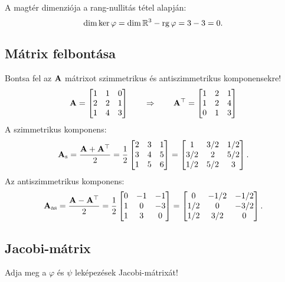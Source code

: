 \documentclass{szb-solution}
\begin{document}
A magtér dimenziója a rang-nullitás tétel alapján:
$$
  \dim \ker \varphi = \dim \mathbb{R}^3 - \operatorname{rg} \varphi = 3 - 3 = 0
  \text.
$$

\subsection{Mátrix felbontása}

Bontsa fel az $\mathbf{A}$ mátrixot szimmetrikus és antiszimmetrikus komponensekre!
$$
  \mathbf{A} = \begin{bmatrix}
    1 & 1 & 0 \\
    2 & 2 & 1 \\
    1 & 4 & 3
  \end{bmatrix}
  \qquad\Rightarrow\qquad
  \mathbf{A}^\top = \begin{bmatrix}
    1 & 2 & 1 \\
    1 & 2 & 4 \\
    0 & 1 & 3
  \end{bmatrix}
$$
A szimmetrikus komponens:
$$
  \mathbf{A}_\text{s} = \frac{\mathbf{A} + \mathbf{A}^\top}{2} = \frac{1}{2} \begin{bmatrix}
    2 & 3 & 1 \\
    3 & 4 & 5 \\
    1 & 5 & 6
  \end{bmatrix} = \begin{bmatrix}
    1   & 3/2 & 1/2 \\
    3/2 & 2   & 5/2 \\
    1/2 & 5/2 & 3
  \end{bmatrix}
  \text.
$$
Az antiszimmetrikus komponens:
$$
  \mathbf{A}_\text{as} = \frac{\mathbf{A} - \mathbf{A}^\top}{2} = \frac{1}{2} \begin{bmatrix}
    0 & -1 & -1 \\
    1 & 0  & -3 \\
    1 & 3  & 0
  \end{bmatrix} = \begin{bmatrix}
    0   & -1/2 & -1/2 \\
    1/2 & 0    & -3/2 \\
    1/2 & 3/2  & 0
  \end{bmatrix}
  \text.
$$

\subsection{Jacobi-mátrix}

Adja meg a $\varphi$ és $\psi$ leképezések Jacobi-mátrixát!
\end{document}
